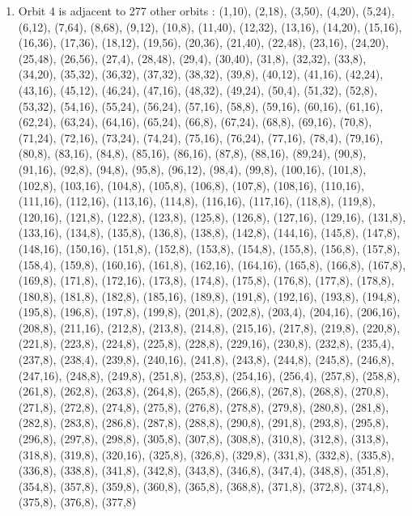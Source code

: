 \documentclass[12pt]{article}
\begin{document}
\begin{enumerate}
\item Orbit 4 is adjacent to 277 other orbits : (1,10), (2,18), (3,50), (4,20), (5,24), (6,12), (7,64), (8,68), (9,12), (10,8), (11,40), (12,32), (13,16), (14,20), (15,16), (16,36), (17,36), (18,12), (19,56), (20,36), (21,40), (22,48), (23,16), (24,20), (25,48), (26,56), (27,4), (28,48), (29,4), (30,40), (31,8), (32,32), (33,8), (34,20), (35,32), (36,32), (37,32), (38,32), (39,8), (40,12), (41,16), (42,24), (43,16), (45,12), (46,24), (47,16), (48,32), (49,24), (50,4), (51,32), (52,8), (53,32), (54,16), (55,24), (56,24), (57,16), (58,8), (59,16), (60,16), (61,16), (62,24), (63,24), (64,16), (65,24), (66,8), (67,24), (68,8), (69,16), (70,8), (71,24), (72,16), (73,24), (74,24), (75,16), (76,24), (77,16), (78,4), (79,16), (80,8), (83,16), (84,8), (85,16), (86,16), (87,8), (88,16), (89,24), (90,8), (91,16), (92,8), (94,8), (95,8), (96,12), (98,4), (99,8), (100,16), (101,8), (102,8), (103,16), (104,8), (105,8), (106,8), (107,8), (108,16), (110,16), (111,16), (112,16), (113,16), (114,8), (116,16), (117,16), (118,8), (119,8), (120,16), (121,8), (122,8), (123,8), (125,8), (126,8), (127,16), (129,16), (131,8), (133,16), (134,8), (135,8), (136,8), (138,8), (142,8), (144,16), (145,8), (147,8), (148,16), (150,16), (151,8), (152,8), (153,8), (154,8), (155,8), (156,8), (157,8), (158,4), (159,8), (160,16), (161,8), (162,16), (164,16), (165,8), (166,8), (167,8), (169,8), (171,8), (172,16), (173,8), (174,8), (175,8), (176,8), (177,8), (178,8), (180,8), (181,8), (182,8), (185,16), (189,8), (191,8), (192,16), (193,8), (194,8), (195,8), (196,8), (197,8), (199,8), (201,8), (202,8), (203,4), (204,16), (206,16), (208,8), (211,16), (212,8), (213,8), (214,8), (215,16), (217,8), (219,8), (220,8), (221,8), (223,8), (224,8), (225,8), (228,8), (229,16), (230,8), (232,8), (235,4), (237,8), (238,4), (239,8), (240,16), (241,8), (243,8), (244,8), (245,8), (246,8), (247,16), (248,8), (249,8), (251,8), (253,8), (254,16), (256,4), (257,8), (258,8), (261,8), (262,8), (263,8), (264,8), (265,8), (266,8), (267,8), (268,8), (270,8), (271,8), (272,8), (274,8), (275,8), (276,8), (278,8), (279,8), (280,8), (281,8), (282,8), (283,8), (286,8), (287,8), (288,8), (290,8), (291,8), (293,8), (295,8), (296,8), (297,8), (298,8), (305,8), (307,8), (308,8), (310,8), (312,8), (313,8), (318,8), (319,8), (320,16), (325,8), (326,8), (329,8), (331,8), (332,8), (335,8), (336,8), (338,8), (341,8), (342,8), (343,8), (346,8), (347,4), (348,8), (351,8), (354,8), (357,8), (359,8), (360,8), (365,8), (368,8), (371,8), (372,8), (374,8), (375,8), (376,8), (377,8)

\end{enumerate}
\end{document}
